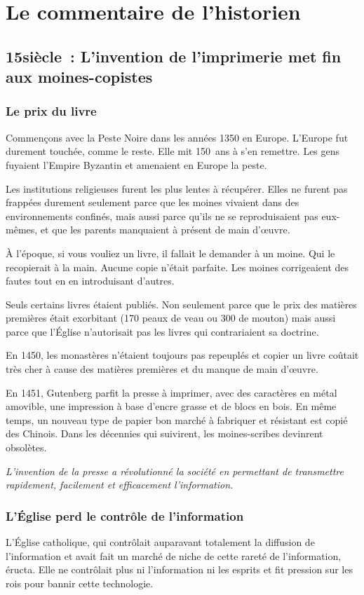 \chapter{Le commentaire de l'historien}

\section{15\ieme siècle~: L'invention de l'imprimerie met fin aux moines-copistes}

\subsection{Le prix du livre}
Commençons avec la Peste Noire dans les années 1350 en Europe. L'Europe fut durement touchée, comme le reste. Elle mit 150 ans à s'en remettre. Les gens fuyaient l'Empire Byzantin et amenaient en
Europe la peste.

Les institutions religieuses furent les plus lentes à récupérer. Elles ne furent pas frappées durement seulement parce que les moines vivaient dans des environnements confinés, mais aussi parce qu'ils
ne se reproduisaient pas eux-mêmes, et que les parents manquaient à présent de main d'œuvre.

À l'époque, si vous vouliez un livre, il fallait le demander à un moine. Qui le recopierait à la main.
Aucune copie n'était parfaite. Les moines corrigeaient des fautes tout en en introduisant d'autres.

Seuls certains livres étaient publiés. Non seulement parce que le prix des matières premières était exorbitant (170 peaux de veau ou 300 de mouton)
mais aussi parce que l'Église n'autorisait pas les livres qui contrariaient sa doctrine.

En 1450, les monastères n'étaient toujours pas repeuplés et copier un livre coûtait très cher à cause des matières premières et du manque de main d'œuvre. 

En 1451, Gutenberg parfit la
presse à imprimer, avec des caractères en métal amovible, une impression à base d'encre grasse et de blocs en bois. En même temps, un nouveau type de papier bon marché à fabriquer et résistant est
copié des Chinois. Dans les décennies qui suivirent, les moines-scribes devinrent obsolètes.

\emph{L'invention de la presse a révolutionné la société en permettant de transmettre rapidement, facilement et efficacement l'information.}
\subsection{L'Église perd le contrôle de l'information}
L'Église catholique, qui contrôlait auparavant totalement la diffusion de l'information et avait fait un marché de niche de cette rareté de l'information, éructa. Elle ne contrôlait plus ni
l'information ni les esprits et fit pression sur les rois pour bannir cette technologie.

